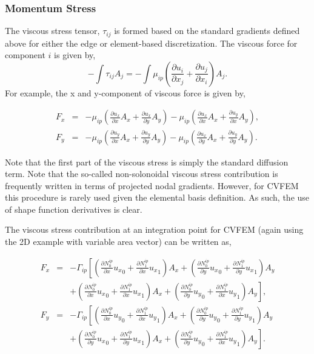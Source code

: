 \subsubsection{Momentum Stress}
The viscous stress tensor, $\tau_{ij}$ is formed based on the
standard gradients defined above for either the edge or element-based 
discretization. The viscous force for component $i$ is given by,
\begin{equation}
  -\int \tau_{ij} A_j = -\int \mu_{ip}\left( \frac{\partial u_i}{\partial x_j} + \frac{\partial u_j}{\partial x_i} \right) A_j.
\end{equation}
\label{viscousStress}
%
For example, the x and y-component of viscous force is 
given by,

\begin{eqnarray}
F_x &=& - \mu_{ip} \left( \frac{\partial u_x}{ \partial x}A_x + \frac{\partial u_x}{\partial y}A_y \right ) 
- \mu_{ip} \left( \frac{\partial u_x}{ \partial x}A_x + \frac{\partial u_y}{ \partial x}A_y \right), \\
F_y &=& - \mu_{ip} \left( \frac{\partial u_y}{ \partial x}A_x + \frac{\partial u_y}{\partial y}A_y \right ) 
- \mu_{ip} \left( \frac{\partial u_x}{ \partial y}A_x + \frac{\partial u_y}{ \partial y}A_y \right).
\end{eqnarray}

Note that the first part of the viscous stress is simply the 
standard diffusion term. Note that the so-called non-solonoidal 
viscous stress contribution is frequently written in terms of projected
nodal gradients. However, for CVFEM this procedure is rarely used 
given the elemental basis definition. As such, the use of
shape function derivatives is clear.

The viscous stress contribution at an integration point for CVFEM (again using the 2D example
with variable area vector) can be written as,

\begin{eqnarray}
  F_x &=& - \Gamma_{ip} \left[ \left(\frac{\partial N^{ip}_0} {\partial x} {u_x}_0 + \frac{\partial N^{ip}_1} {\partial x} {u_x}_1 \right) A_x + \left(\frac{\partial N^{ip}_0} {\partial y} {u_x}_0 + \frac{\partial N^{ip}_1} {\partial y} {u_x}_1 \right) A_y \right. \nonumber \\ &&
  + \left. \left(\frac{\partial N^{ip}_0} {\partial x} {u_x}_0 + \frac{\partial N^{ip}_1} {\partial x} {u_x}_1 \right) A_x + \left(\frac{\partial N^{ip}_0} {\partial y} {u_y}_0 + \frac{\partial N^{ip}_1} {\partial x} {u_y}_1 \right) A_y \right], \\ 
  F_y &=& - \Gamma_{ip} \left[ \left(\frac{\partial N^{ip}_0} {\partial x} {u_y}_0 + \frac{\partial N^{ip}_1} {\partial x} {u_y}_1 \right) A_x + \left(\frac{\partial N^{ip}_0} {\partial y} {u_y}_0 + \frac{\partial N^{ip}_1} {\partial y} {u_y}_1 \right) A_y \right. \nonumber \\ &&
  + \left. \left(\frac{\partial N^{ip}_0} {\partial y} {u_x}_0 + \frac{\partial N^{ip}_1} {\partial y} {u_x}_1 \right) A_x + \left(\frac{\partial N^{ip}_0} {\partial y} {u_y}_0 + \frac{\partial N^{ip}_1} {\partial x} {u_y}_1 \right) A_y \right].
\end{eqnarray}

